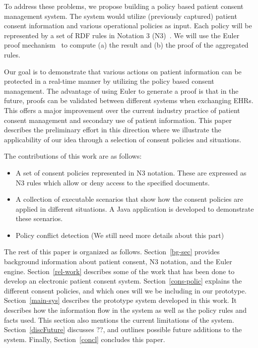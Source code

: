 \documentclass[conference]{IEEEtran}
\begin{document}
To address these problems, we propose building a policy based patient consent management system. The system would utilize (previously captured) patient consent information and various operational policies as input. Each policy will be represented by a set of RDF rules in Notation 3 (N3)~\cite{N3not}.  We will use the Euler proof mechanism~\cite{eurlorprf} to compute (a) the result and (b) the proof of the aggregated rules.  

Our goal is to demonstrate that various actions on patient information can be protected in a real-time manner by utilizing the policy based consent management. The advantage of using Euler to generate a proof is that in the future, proofs can be validated between different systems when exchanging EHRs. This offers a major improvement over the current industry practice of patient consent management and secondary use of patient information. This paper describes the preliminary effort in this direction where we illustrate the applicability of our idea through a selection of consent policies and situations.

The contributions of this work are as follows: 

\begin{itemize}
    \item A set of consent policies represented in N3 notation. These are expressed as N3 rules which allow or deny access to the specified documents.

\item A collection of executable scenarios that show how the consent policies are applied in different situations. A Java application is developed to demonstrate these scenarios.

\item Policy conflict detection (We still need more details about this part)
\end{itemize}

The rest of this paper is organized as follows. Section~\ref{bg-sec} provides background information about patient consent, N3 notation, and the Euler engine. Section~\ref{rel-work} describes some of the work that has been done to develop an electronic patient consent system. Section~\ref{cons-polic} explains the different consent policies, and which ones will we be including in our prototype. Section~\ref{main-sys} describes the prototype system developed in this work. It describes how the information flow in the system as well as the policy rules and facts used. This section also mentions the current limitations of the system. Section~\ref{discFuture} discusses ??, and outlines possible future additions to the system. Finally, Section~\ref{concl} concludes this paper.
\end{document}
